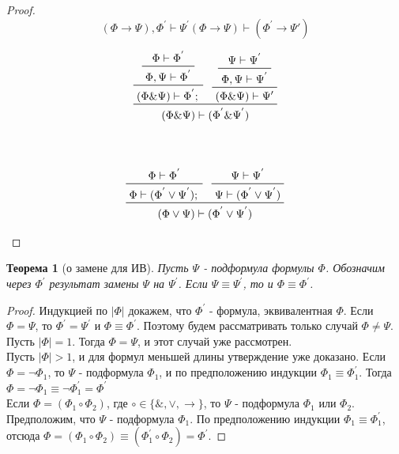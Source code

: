 \documentclass[a4paper]{article}
\newtheorem*{theorem*}{Теорема}
\theoremstyle{definition}
\begin{document}
\begin{enumerate}
\begin{proof}
\begin{displaymath}
{          {{(\Phi \rightarrow \Psi), \Phi^{'} \vdash \Psi^{'}}}
         }
         {(\Phi \rightarrow \Psi) \vdash (\Phi^{'} \rightarrow \Psi{'})}
        \end{displaymath}
        \begin{multicols}{2}
         \begin{displaymath}
          \prftree
          {\prftree
           {\prftree
            {\Phi \vdash \Phi^{'}}
            {\Phi, \Psi \vdash \Phi^{'}}}
           {(\Phi \& \Psi) \vdash \Phi^{'};}}{\prftree
           {\prftree
            {\Psi \vdash \Psi^{'}}
            {\Phi, \Psi \vdash \Psi^{'}}}
           {(\Phi \& \Psi) \vdash \Psi{'}}}
          {(\Phi \& \Psi) \vdash (\Phi^{'} \& \Psi^{'})}
         \end{displaymath}
         \columnbreak
         \\ \\
         \begin{displaymath}
          \prftree
          {\prftree
           {\Phi \vdash \Phi^{'}}
           {\Phi \vdash (\Phi^{'} \vee \Psi^{'});}}{
           \prftree
           {\Psi \vdash \Psi^{'}}
           {\Psi \vdash (\Phi^{'} \vee \Psi^{'})}}
          {(\Phi \vee \Psi) \vdash (\Phi^{'} \vee \Psi^{'})}
         \end{displaymath}
        \end{multicols}
       \end{proof}
       \begin{theorem*}[о замене для ИВ]
        Пусть $\Psi$ - подформула формулы $\Phi$. Обозначим через $\Phi^{'}$ результат замены $\Psi$ на $\Psi^{'}$. Если $\Psi \equiv \Psi^{'}$, то и $\Phi \equiv \Phi^{'}$.
       \end{theorem*}
       \begin{proof}
        Индукцией по $|\Phi|$ докажем, что $\Phi^{'}$ - формула, эквивалентная $\Phi$. Если $\Phi = \Psi$, то $\Phi^{'} = \Psi^{'}$ и $\Phi \equiv \Phi^{'}$. Поэтому будем рассматривать только случай $\Phi \neq \Psi$.\\
        Пусть $|\Phi| = 1$. Тогда $\Phi = \Psi$, и этот случай уже рассмотрен.\\
        Пусть $|\Phi| > 1$, и для формул меньшей длины утверждение уже доказано. Если $\Phi =  \neg \Phi_1$, то $\Psi$ - подформула $\Phi_1$, и по предположению индукции $\Phi_1 \equiv \Phi^{'}_1$. Тогда $\Phi = \neg \Phi_1 \equiv \neg \Phi^{'}_1 = \Phi^{'}$ \\
        Если $\Phi = (\Phi_1 \circ \Phi_2)$, где $\circ \in \{\&, \vee, \rightarrow\}$, то $\Psi$ - подформула $\Phi_1$ или $\Phi_2$. Предположим, что $\Psi$ - подформула $\Phi_1$. По предположению индукции $\Phi_1 \equiv \Phi^{'}_1$, отсюда $\Phi = (\Phi_1 \circ \Phi_2) \equiv (\Phi^{'}_1 \circ \Phi_2) = \Phi^{'}$.

\end{proof}
\end{enumerate}
\end{document}
